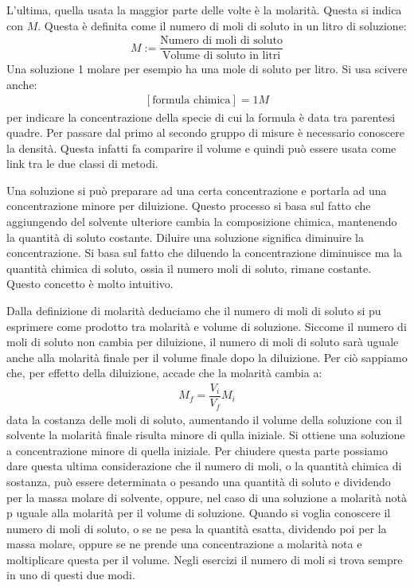 \documentclass[../AppuntiChimica]{subfiles}
\begin{document}
	L'ultima, quella usata la maggior parte delle volte è la molarità. Questa si indica con $ M $. Questa è definita come il numero di moli di soluto in un litro di soluzione:
	\begin{gather*}
	M:=\dfrac{\text{Numero di moli di soluto}}{\text{Volume di soluto in litri}}
	\end{gather*}
	Una soluzione 1 molare per esempio ha una mole di soluto per litro. Si usa scivere anche:
	\begin{gather*}
		\left[\text{formula chimica}\right]=1M
	\end{gather*}
	per indicare la concentrazione della specie di cui la formula è data tra parentesi quadre. Per passare dal primo al secondo gruppo di misure è necessario conoscere la  densità. Questa infatti fa comparire il volume e quindi può essere usata come link tra le due classi di metodi. 
	
	Una soluzione si può preparare ad una certa concentrazione e portarla ad una concentrazione minore per diluizione. Questo processo si basa sul fatto che aggiungendo del solvente ulteriore cambia la composizione chimica, mantenendo la quantità di soluto costante. Diluire una soluzione significa diminuire la concentrazione. Si basa sul fatto che diluendo la concentrazione diminuisce ma la quantità chimica di soluto, ossia il numero moli di soluto, rimane costante. Questo concetto è molto intuitivo.
	
	Dalla definizione di molarità deduciamo che il numero di moli di soluto si pu esprimere come prodotto tra molarità e volume di soluzione. Siccome il numero di moli di soluto non cambia per diluizione, il numero di moli di soluto sarà uguale anche alla molarità finale per il volume finale dopo la diluizione. Per ciò sappiamo che, per effetto della diluizione, accade che la molarità cambia a:
	\begin{gather*}
	\label{eqn:dilmol}
	M_{f}=\dfrac{V_{i}}{V_{f}}M_{i}
	\end{gather*}
	data la costanza delle moli di soluto, aumentando il volume della soluzione con il solvente la molarità finale risulta minore di qulla iniziale. Si ottiene una soluzione a concentrazione minore di quella iniziale. Per chiudere questa parte possiamo dare questa ultima considerazione che il numero di moli, o la quantità chimica di sostanza, può essere determinata o pesando una quantità di soluto e dividendo per la massa molare di solvente, oppure, nel caso di una soluzione a molarità notà p uguale alla molarità per il volume di soluzione. Quando si voglia conoscere il numero di moli di soluto, o se ne pesa la quantità esatta, dividendo poi per la massa molare, oppure se ne prende una concentrazione a molarità nota e moltiplicare questa per il volume. Negli esercizi il numero di moli si trova sempre in uno di questi due modi. 
	
\end{document}
